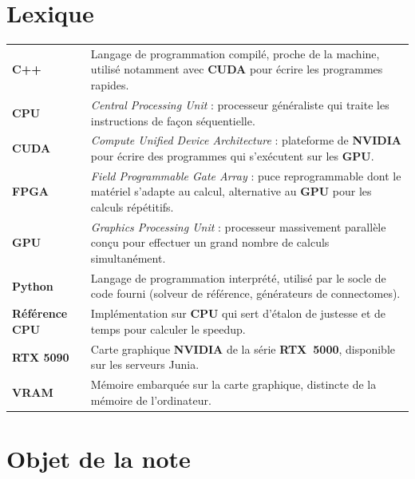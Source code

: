 \documentclass{report}
\title{\DocName}
\author{\DocAuthors}
\date{\textbf{JUNIA - ISEN - AP4} \url{https://github.com/CharlesBta/Modele-Neuronaux-RD.git}}
\begin{document}
\maketitle

\chapter*{Lexique}

\begin{tabular}{@{}p{3.9cm}p{11cm}@{}}
    \textbf{C++} & Langage de programmation compilé, proche de la machine, utilisé notamment avec \textbf{CUDA} pour écrire les programmes rapides. \\[6pt]
    \textbf{CPU} & \emph{Central Processing Unit} : processeur généraliste qui traite les instructions de façon séquentielle. \\[6pt]
    \textbf{CUDA} & \emph{Compute Unified Device Architecture} : plateforme de \textbf{NVIDIA} pour écrire des programmes qui s'exécutent sur les \textbf{GPU}. \\[6pt]
    \textbf{FPGA} & \emph{Field Programmable Gate Array} : puce reprogrammable dont le matériel s'adapte au calcul, alternative au \textbf{GPU} pour les calculs répétitifs. \\[6pt]
    \textbf{GPU} & \emph{Graphics Processing Unit} : processeur massivement parallèle conçu pour effectuer un grand nombre de calculs simultanément. \\[6pt]
    \textbf{Python} & Langage de programmation interprété, utilisé par le socle de code fourni (solveur de référence, générateurs de connectomes). \\[6pt]
    \textbf{Référence CPU} & Implémentation sur \textbf{CPU} qui sert d'étalon de justesse et de temps pour calculer le speedup. \\[6pt]
    \textbf{RTX 5090} & Carte graphique \textbf{NVIDIA} de la série \textbf{RTX~5000}, disponible sur les serveurs Junia. \\[6pt]
    \textbf{VRAM} & Mémoire embarquée sur la carte graphique, distincte de la mémoire de l'ordinateur. \\
\end{tabular}

\tableofcontents

\chapter{Objet de la note}
\end{document}
